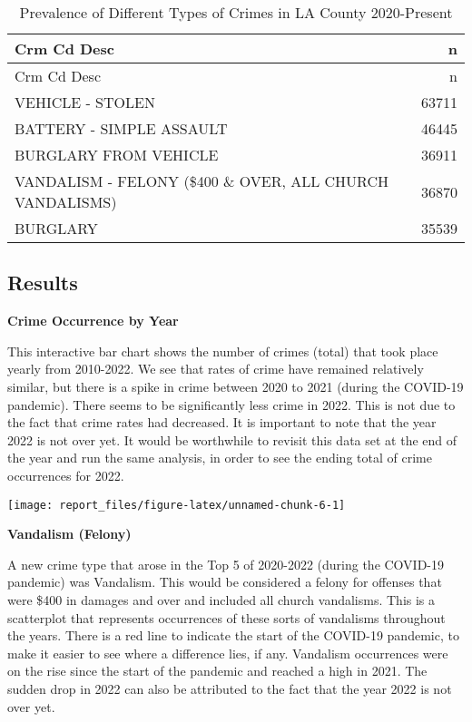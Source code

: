 \documentclass[
]{article}
\begin{document}
\begin{longtable}[]{@{}lr@{}}
\caption{Prevalence of Different Types of Crimes in LA County
2020-Present}\tabularnewline
\toprule()
Crm Cd Desc & n \\
\midrule()
\endfirsthead
\toprule()
Crm Cd Desc & n \\
\midrule()
\endhead
VEHICLE - STOLEN & 63711 \\
BATTERY - SIMPLE ASSAULT & 46445 \\
BURGLARY FROM VEHICLE & 36911 \\
VANDALISM - FELONY (\$400 \& OVER, ALL CHURCH VANDALISMS) & 36870 \\
BURGLARY & 35539 \\
\bottomrule()
\end{longtable}

\hypertarget{results}{%
\subsection{Results}\label{results}}

\textbf{Crime Occurrence by Year}

This interactive bar chart shows the number of crimes (total) that took
place yearly from 2010-2022. We see that rates of crime have remained
relatively similar, but there is a spike in crime between 2020 to 2021
(during the COVID-19 pandemic). There seems to be significantly less
crime in 2022. This is not due to the fact that crime rates had
decreased. It is important to note that the year 2022 is not over yet.
It would be worthwhile to revisit this data set at the end of the year
and run the same analysis, in order to see the ending total of crime
occurrences for 2022.

\begin{center}\texttt{[image: report\_files/figure-latex/unnamed-chunk-6-1]} \end{center}

\textbf{Vandalism (Felony)}

A new crime type that arose in the Top 5 of 2020-2022 (during the
COVID-19 pandemic) was Vandalism. This would be considered a felony for
offenses that were \$400 in damages and over and included all church
vandalisms. This is a scatterplot that represents occurrences of these
sorts of vandalisms throughout the years. There is a red line to
indicate the start of the COVID-19 pandemic, to make it easier to see
where a difference lies, if any. Vandalism occurrences were on the rise
since the start of the pandemic and reached a high in 2021. The sudden
drop in 2022 can also be attributed to the fact that the year 2022 is
not over yet.
\end{document}
